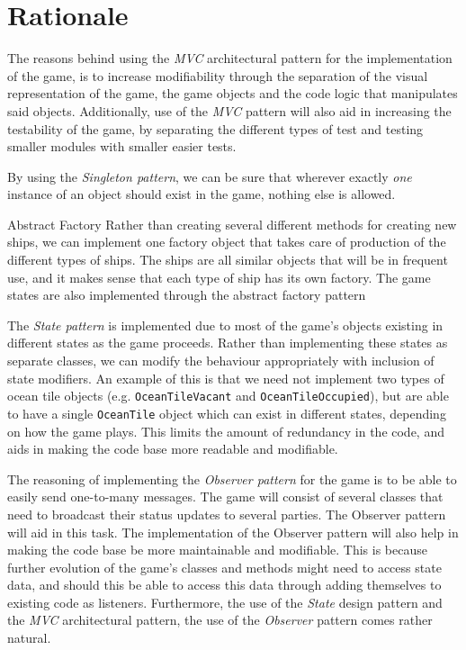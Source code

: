 \chapter{Rationale}
    

The reasons behind using the \emph{MVC} architectural pattern for the implementation of the game, is to increase modifiability through the separation of the visual representation of the game, the game objects and the code logic that manipulates said objects. Additionally, use of the \emph{MVC} pattern will also aid in increasing the testability of the game, by separating the different types of test and testing smaller modules with smaller easier tests.


By using the \emph{Singleton pattern}, we can be sure that wherever exactly \emph{one} instance of an object should exist in the game, nothing else is allowed.


Abstract Factory
Rather than creating several different methods for creating new ships, we can implement one factory object that takes care of production of the different types of ships. The ships are all similar objects that will be in frequent use, and it makes sense that each type of ship has its own factory.
The game states are also implemented through the abstract factory pattern


The \emph{State pattern} is implemented due to most of the game's objects existing in different states as the game proceeds. Rather than implementing these states as separate classes, we can modify the behaviour appropriately with inclusion of state modifiers. An example of this is that we need not implement two types of ocean tile objects (e.g. \texttt{OceanTileVacant} and \texttt{OceanTileOccupied}), but are able to have a single \texttt{OceanTile} object which can exist in different states, depending on how the game plays. This limits the amount of redundancy in the code, and aids in making the code base more readable and modifiable.


The reasoning of implementing the \emph{Observer pattern} for the game is to be able to easily send one-to-many messages. The game will consist of several classes that need to broadcast their status updates to several parties. The Observer pattern will aid in this task. The implementation of the Observer pattern will also help in making the code base be more maintainable and modifiable. This is because further evolution of the game's classes and methods might need to access state data, and should this be able to access this data through adding themselves to existing code as listeners. Furthermore, the use of the \emph{State} design pattern and the \emph{MVC} architectural pattern, the use of the \emph{Observer} pattern comes rather natural.